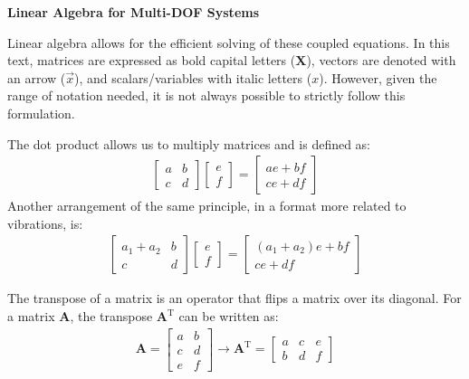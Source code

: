 \documentclass[12pt,letter]{article}
\begin{document}
\begin{review}
\textbf{Linear Algebra for Multi-DOF Systems}

\noindent Linear algebra allows for the efficient solving of these coupled equations. In this text, matrices are expressed as bold capital letters ($\textbf{X}$), vectors are denoted with an arrow ($\vec{x}$), and scalars/variables with italic letters ($x$). However, given the range of notation needed, it is not always possible to strictly follow this formulation.

The dot product allows us to multiply matrices and is defined as:
\begin{eqnarray}
\begin{bmatrix} a & b \\ c & d \end{bmatrix}\begin{bmatrix} e \\  f \end{bmatrix} = \begin{bmatrix} ae+bf \\ ce + df \end{bmatrix}
\end{eqnarray}
Another arrangement of the same principle, in a format more related to vibrations, is:
\begin{eqnarray}
\begin{bmatrix} a_1+a_2 & b \\ c & d \end{bmatrix}\begin{bmatrix} e \\  f \end{bmatrix} = \begin{bmatrix} (a_1+a_2)e+bf \\ ce + df \end{bmatrix}
\end{eqnarray}

The transpose of a matrix is an operator that flips a matrix over its diagonal. For a matrix $\textbf{A}$, the transpose $\textbf{A}^\text{T}$ can be written as:
\begin{eqnarray}
\textbf{A} = \begin{bmatrix} a & b \\ c & d \\ e & f\end{bmatrix} \rightarrow \textbf{A}^\text{T} = \begin{bmatrix} a & c & e \\  b & d & f \end{bmatrix}
\end{eqnarray}


\end{review}
\end{document}
